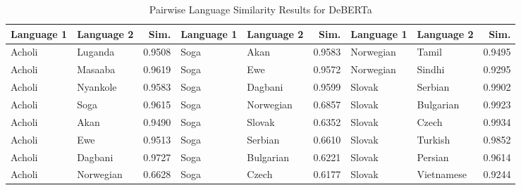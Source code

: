 \documentclass[11pt]{article} %
\begin{document}
    \begin{table}
        [p]
        \centering
        \caption{Pairwise Language Similarity Results for DeBERTa}
        \label{tab:deberta-sim} \tiny
        \setlength{\tabcolsep}{3.2pt}
        \renewcommand{\arraystretch}{0.9}
        \begin{tabular}{llr@{\hspace{12pt}}llr@{\hspace{12pt}}llr}
            \toprule \textbf{Language 1} & \textbf{Language 2} & \textbf{Sim.} & \textbf{Language 1} & \textbf{Language 2} & \textbf{Sim.} & \textbf{Language 1} & \textbf{Language 2} & \textbf{Sim.} \\
            \midrule Acholi              & Luganda             & 0.9508        & Soga                & Akan                & 0.9583        & Norwegian           & Tamil               & 0.9495        \\
            Acholi                       & Masaaba             & 0.9619        & Soga                & Ewe                 & 0.9572        & Norwegian           & Sindhi              & 0.9295        \\
            Acholi                       & Nyankole            & 0.9583        & Soga                & Dagbani             & 0.9599        & Slovak              & Serbian             & 0.9902        \\
            Acholi                       & Soga                & 0.9615        & Soga                & Norwegian           & 0.6857        & Slovak              & Bulgarian           & 0.9923        \\
            Acholi                       & Akan                & 0.9490        & Soga                & Slovak              & 0.6352        & Slovak              & Czech               & 0.9934        \\
            Acholi                       & Ewe                 & 0.9513        & Soga                & Serbian             & 0.6610        & Slovak              & Turkish             & 0.9852        \\
            Acholi                       & Dagbani             & 0.9727        & Soga                & Bulgarian           & 0.6221        & Slovak              & Persian             & 0.9614        \\
            Acholi                       & Norwegian           & 0.6628        & Soga                & Czech               & 0.6177        & Slovak              & Vietnamese          & 0.9244        \\

\end{tabular}
\end{table}
\end{document}

